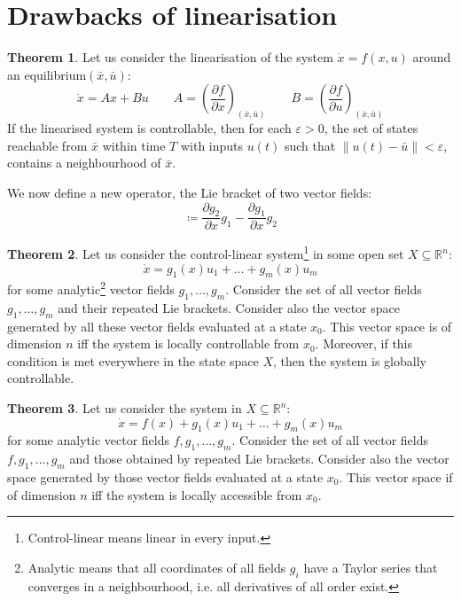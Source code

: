 \documentclass[12pt, openany]{report}
\theoremstyle{definition}
\newtheorem{thm}{Theorem}[chapter]
\newcommand{\R}{\mathbb{R}}
\begin{document}
\section{Drawbacks of linearisation}
\begin{thm}
Let us consider the linearisation of the system \(\dot x=f(x,u)\) around an equilibrium\((\bar x,\bar u)\): 
\begin{equation}
    \dot x = Ax+Bu \qquad A= \left(\frac{\partial f}{\partial x}\right)_{(\bar x,\bar u)} \qquad B = \left(\frac{\partial f}{\partial u}\right)_{(\bar x,\bar u)}
\end{equation}
If the linearised system is controllable, then for each \(\varepsilon >0\), the set of states reachable from \(\bar x\) within time \(T\) with inputs \(u(t)\) such that \(\lVert u(t)-\bar u\rVert <\varepsilon \), contains a neighbourhood of \(\bar x\).
\end{thm}
We now define a new operator, the Lie bracket of two vector fields:
\begin{equation}
    [g_1,g_2] \coloneqq \frac{\partial g_2}{\partial x}g_1-\frac{\partial g_1}{\partial x}g_2
\end{equation}
\begin{thm}
    Let us consider the control-linear system\footnote{Control-linear means linear in every input.} in some open set \(X\subseteq \R^n\):
    \begin{equation}
        \dot x= g_1(x)u_1 + \dots + g_m(x)u_m
    \end{equation}
    for some analytic\footnote{Analytic means that all coordinates of all fields \(g_i\) have a Taylor series that converges in a neighbourhood, i.e. all derivatives of all order exist.} vector fields \(g_1,\dots,g_m\). Consider the set of all vector fields \(g_1,\dots,g_m\) and their repeated Lie brackets. Consider also the vector space generated by all these vector fields evaluated at a state \(x_0\). This vector space is of dimension \(n\) iff the system is locally controllable from \(x_0\). Moreover, if this condition is met everywhere in the state space \(X\), then the system is globally controllable.
\end{thm}
\begin{thm}
    Let us consider the system in \(X\subseteq \R^n\):
    \begin{equation}
        \dot x=f(x)+g_1(x)u_1 + \dots + g_m(x)u_m
    \end{equation}
    for some analytic vector fields \(f,g_1,\dots,g_m\). Consider the set of all vector fields \(f,g_1,\dots,g_m\) and those obtained by repeated Lie brackets. Consider also the vector space generated by those vector fields evaluated at a state \(x_0\). This vector space if of dimension \(n\) iff the system is locally accessible from \(x_0\).
\end{thm}
\end{document}
